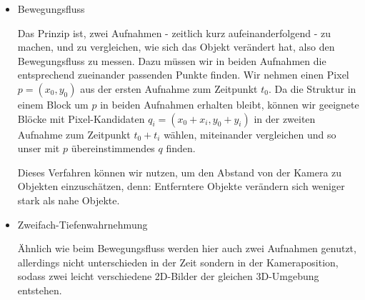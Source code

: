 \begin{itemize}
\item Bewegungsfluss

Das Prinzip ist, zwei Aufnahmen - zeitlich kurz aufeinanderfolgend - zu machen, und zu vergleichen, wie sich das Objekt verändert hat, also den Bewegungsfluss zu messen. Dazu müssen wir in beiden Aufnahmen die entsprechend zueinander passenden Punkte finden. Wir nehmen einen Pixel $p=(x_0,y_0)$ aus der ersten Aufnahme zum Zeitpunkt $t_0$. Da die Struktur in einem Block um $p$ in beiden Aufnahmen erhalten bleibt, können wir geeignete Blöcke mit Pixel-Kandidaten $q_i=(x_0+x_i,y_0+y_i)$ in der zweiten Aufnahme zum Zeitpunkt $t_0+t_i$ wählen, miteinander vergleichen und so unser mit $p$ übereinstimmendes $q$ finden.

Dieses Verfahren können wir nutzen, um den Abstand von der Kamera zu Objekten einzuschätzen, denn: Entferntere Objekte verändern sich weniger stark als nahe Objekte.

\item Zweifach-Tiefenwahrnehmung

Ähnlich wie beim Bewegungsfluss werden hier auch zwei Aufnahmen genutzt, allerdings nicht unterschieden in der Zeit sondern in der Kameraposition, sodass zwei leicht verschiedene 2D-Bilder der gleichen 3D-Umgebung entstehen.


\end{itemize}
